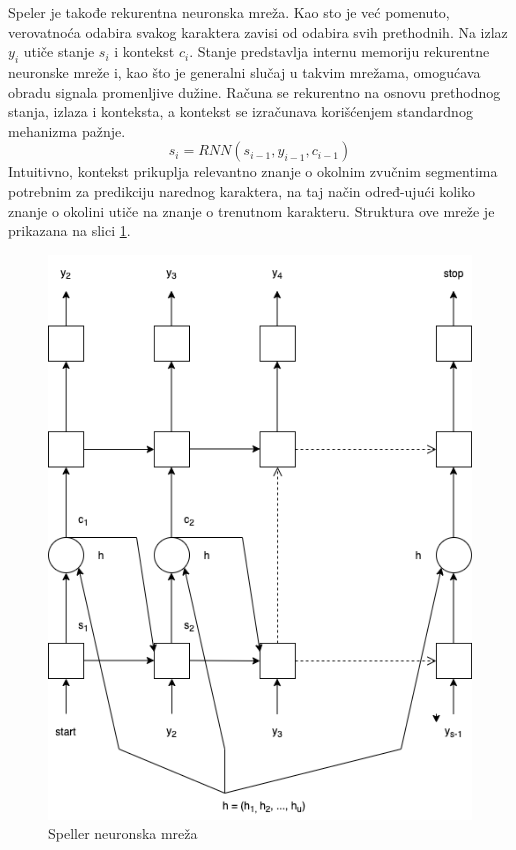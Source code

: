 \documentclass[a4paper]{article}
\begin{document}
Speler je takođe rekurentna neuronska mreža.
Kao sto je već pomenuto, verovatnoća odabira svakog karaktera zavisi od odabira svih prethodnih.
Na izlaz $y_i$ utiče stanje $s_i$ i kontekst $c_i$.
Stanje predstavlja internu memoriju rekurentne neuronske mreže i, kao što je generalni slučaj u takvim mrežama, omogućava obradu signala promenljive dužine. Računa se rekurentno na osnovu prethodnog stanja, izlaza i konteksta, a kontekst se izračunava korišćenjem standardnog mehanizma pažnje.
\begin{equation}
  \label{eq:state}
  s_i = RNN(s_{i-1}, y_{i-1}, c_{i-1})
\end{equation}
Intuitivno, kontekst prikuplja relevantno znanje o okolnim zvučnim segmentima potrebnim za predikciju narednog karaktera, na taj način određ-ujući koliko znanje o okolini utiče na znanje o trenutnom karakteru.
Struktura ove mreže je prikazana na slici \ref{fig:speller_model}. 
\begin{figure}[h!]
  \begin{center}
    \includegraphics[scale=0.3]{speller.png}
  \end{center}
  \caption{Speller neuronska mreža}
  \label{fig:speller_model}
\end{figure}
\end{document}
